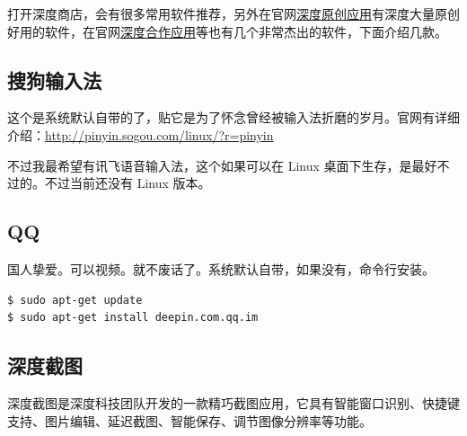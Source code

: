 \documentclass[doctor,openright,twoside]{sjtuthesis}
\theoremstyle{plain}
\theoremstyle{definition}
\theoremstyle{remark}
\theoremstyle{ocrenumbox}
\theoremstyle{plain}
\begin{document}
打开深度商店，会有很多常用软件推荐，另外在官网\href{https://www.deepin.org/original/}{深度原创应用}有深度大量原创好用的软件，在官网\href{https://www.deepin.org/cooperative/}{深度合作应用}等也有几个非常杰出的软件，下面介绍几款。

\hypertarget{section-29}{%
\subsection{搜狗输入法}\label{section-29}}

这个是系统默认自带的了，贴它是为了怀念曾经被输入法折磨的岁月。官网有详细介绍：\url{http://pinyin.sogou.com/linux/?r=pinyin}

不过我最希望有讯飞语音输入法，这个如果可以在 Linux 桌面下生存，是最好不过的。不过当前还没有 Linux 版本。

\hypertarget{qq}{%
\subsection{QQ}\label{qq}}

国人挚爱。可以视频。就不废话了。系统默认自带，如果没有，命令行安装。

\begin{lstlisting}[language=bash]
$ sudo apt-get update
$ sudo apt-get install deepin.com.qq.im
\end{lstlisting}

\hypertarget{section-30}{%
\subsection{深度截图}\label{section-30}}

深度截图是深度科技团队开发的一款精巧截图应用，它具有智能窗口识别、快捷键支持、图片编辑、延迟截图、智能保存、调节图像分辨率等功能。

\end{document}
